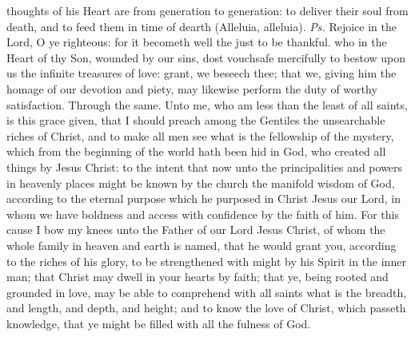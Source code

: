 \introit
{} thoughts of his Heart are from generation to generation: to deliver their soul from death, and to feed them in time of dearth (Alleluia, alleluia). \textit{Ps.} Rejoice in the Lord, O ye righteous: for it becometh well the just to be thankful.
\collect
{} who in the Heart of thy Son, wounded by our sins, dost vouchsafe mercifully to bestow upon us the infinite treasures of love: grant, we beseech thee; that we, giving him the homage of our devotion and piety, may likewise perform the duty of worthy satisfaction. Through the same.
 Unto me, who am less than the least of all saints, is this grace given, that I should preach among the Gentiles the unsearchable riches of Christ, and to make all men see what is the fellowship of the mystery, which from the beginning of the world hath been hid in God, who created all things by Jesus Christ: to the intent that now unto the principalities and powers in heavenly places might be known by the church the manifold wisdom of God, according to the eternal purpose which he purposed in Christ Jesus our Lord, in whom we have boldness and access with confidence by the faith of him. For this cause I bow my knees unto the Father of our Lord Jesus Christ, of whom the whole family in heaven and earth is named, that he would grant you, according to the riches of his glory, to be strengthened with might by his Spirit in the inner man; that Christ may dwell in your hearts by faith; that ye, being rooted and grounded in love, may be able to comprehend with all saints what is the breadth, and length, and depth, and height; and to know the love of Christ, which passeth knowledge, that ye might be filled with all the fulness of God.



